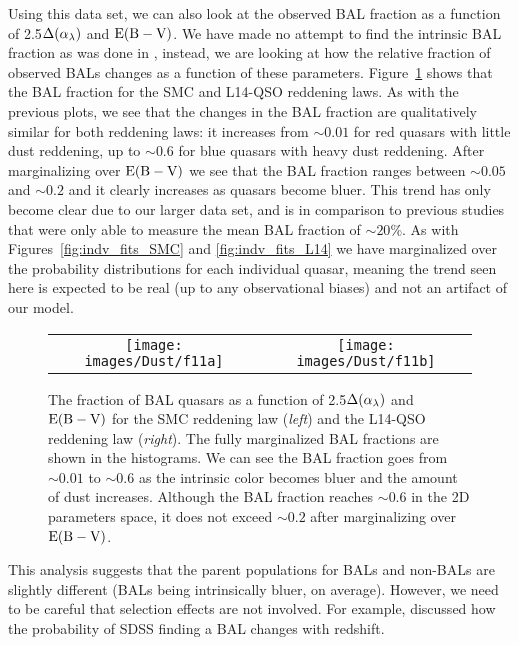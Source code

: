 Using this data set, we can also look at the observed BAL fraction as a function of 2.5$\Delta(\alpha_{\lambda})$ and ${\rm E(B-V)}$.  We have made no attempt to find the intrinsic BAL fraction as was done in \citet{Hewett:2003}, instead, we are looking at how the relative fraction of observed BALs changes as a function of these parameters.  Figure~\ref{fig:bal_frac} shows that the BAL fraction for the SMC and L14-QSO reddening laws.  As with the previous plots, we see that the changes in the BAL fraction are qualitatively similar for both reddening laws: it increases from $\sim0.01$ for red quasars with little dust reddening, up to $\sim0.6$ for blue quasars with heavy dust reddening.  After marginalizing over ${\rm E(B-V)}$ we see that the BAL fraction ranges between $\sim0.05$ and $\sim0.2$ and it clearly increases as quasars become bluer.   This trend has only become clear due to our larger data set, and is in comparison to previous studies \citep[e.g. ][]{Tolea:2002,Hewett:2003,Reichard:2003b} that were only able to measure the mean BAL fraction of $\sim20\%$.
As with Figures~\ref{fig:indv_fits_SMC} and \ref{fig:indv_fits_L14} we have marginalized over the probability distributions for each individual quasar, meaning the trend seen here is expected to be real (up to any observational biases) and not an artifact of our model. 

\begin{figure*}[t]
\begin{center}
\begin{tabular}{cc}
\texttt{[image: images/Dust/f11a]} & \texttt{[image: images/Dust/f11b]} 
\end{tabular}
\caption[BAL fraction]{\label{fig:bal_frac} The fraction of BAL quasars as a function of 2.5$\Delta(\alpha_{\lambda})$ and ${\rm E(B-V)}$ for the SMC reddening law ({\em left}) and the L14-QSO reddening law ({\em right}).  The fully marginalized BAL fractions are shown in the histograms.  We can see the BAL fraction goes from $\sim0.01$ to $\sim0.6$ as the intrinsic color becomes bluer and the amount of dust increases.  Although the BAL fraction reaches $\sim0.6$ in the 2D parameters space, it does not exceed $\sim0.2$ after marginalizing over ${\rm E(B-V)}$.}
\end{center}
\end{figure*}

This analysis suggests that the parent populations for BALs and non-BALs are slightly different (BALs being intrinsically bluer, on average).  However, we need to be careful that selection effects are not involved.  For example, \citet{Reichard:2003b} discussed how the probability of SDSS finding a BAL changes with redshift.

